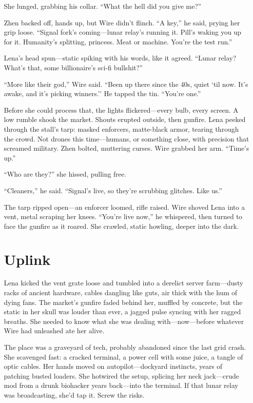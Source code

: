 \documentclass[12pt]{book}
\begin{document}
She lunged, grabbing his collar. ``What the hell did you give me?''

Zhen backed off, hands up, but Wire didn’t flinch. ``A key,'' he said, prying her grip loose. ``Signal fork’s coming---lunar relay’s running it. Pill’s waking you up for it. Humanity’s splitting, princess. Meat or machine. You’re the test run.''

Lena’s head spun---static spiking with his words, like it agreed. ``Lunar relay? What’s that, some billionaire’s sci-fi bullshit?''

``More like their god,'' Wire said. ``Been up there since the 40s, quiet `til now. It’s awake, and it’s picking winners.'' He tapped the tin. ``You’re one.''

Before she could process that, the lights flickered---every bulb, every screen. A low rumble shook the market. Shouts erupted outside, then gunfire. Lena peeked through the stall’s tarp: masked enforcers, matte-black armor, tearing through the crowd. Not drones this time---humans, or something close, with precision that screamed military. Zhen bolted, muttering curses. Wire grabbed her arm. ``Time’s up.''

``Who are they?'' she hissed, pulling free.

``Cleaners,'' he said. ``Signal’s live, so they’re scrubbing glitches. Like us.''

The tarp ripped open---an enforcer loomed, rifle raised. Wire shoved Lena into a vent, metal scraping her knees. ``You’re live now,'' he whispered, then turned to face the gunfire as it roared. She crawled, static howling, deeper into the dark.

\chapter{Uplink}

Lena kicked the vent grate loose and tumbled into a derelict server farm---dusty racks of ancient hardware, cables dangling like guts, air thick with the hum of dying fans. The market's gunfire faded behind her, muffled by concrete, but the static in her skull was louder than ever, a jagged pulse syncing with her ragged breaths. She needed to know what she was dealing with---now---before whatever Wire had unleashed ate her alive.

The place was a graveyard of tech, probably abandoned since the last grid crash. She scavenged fast: a cracked terminal, a power cell with some juice, a tangle of optic cables. Her hands moved on autopilot---dockyard instincts, years of patching busted loaders. She hotwired the setup, splicing her neck jack---crude mod from a drunk biohacker years back---into the terminal. If that lunar relay was broadcasting, she'd tap it. Screw the risks.
\end{document}
